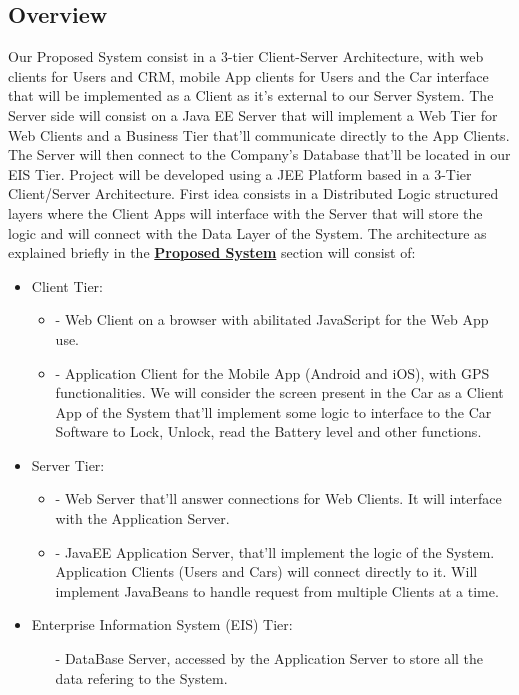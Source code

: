 \documentclass[a4paper]{article}
\begin{document}
\subsection{Overview}
\label{sec:propSystem}
Our Proposed System consist in a 3-tier Client-Server Architecture, with web clients for Users and CRM, mobile App clients for Users and the Car interface that will be implemented as a Client as it's external to our Server System. The Server side will consist on a Java EE Server that will implement a Web Tier for Web Clients and a Business Tier that'll communicate directly to the App Clients. The Server will then connect to the Company's Database that'll be located in our EIS Tier.
Project will be developed using a JEE Platform based in a 3-Tier Client/Server Architecture. First idea consists in a Distributed Logic structured layers where the Client Apps will interface with the Server that will store the logic and will connect with the Data Layer of the System. The architecture as explained briefly in the \textbf{\hyperref[sec:propSystem]{Proposed System}} section will consist of:
\begin {itemize}
\item Client Tier: 
\begin {itemize}
\item [-]Web Client on a browser with abilitated JavaScript for the Web App use. 
\item [-]Application Client for the Mobile App (Android and iOS), with GPS functionalities. We will consider the screen present in the Car as a Client App of the System that'll implement some logic to interface to the Car Software to Lock, Unlock, read the Battery level and other functions.
\end{itemize}

\item Server Tier:
\begin {itemize}
\item [-]Web Server that'll answer connections for Web Clients. It will interface with the Application Server.
\item [-]JavaEE Application Server, that'll implement the logic of the System. Application Clients (Users and Cars) will connect directly to it. Will implement JavaBeans to handle request from multiple Clients at a time.
\end{itemize}

\item Enterprise Information System (EIS) Tier:
\begin{itemize}
\item [-]DataBase Server, accessed by the Application Server to store all the data refering to the System.
\end{itemize}
\end{itemize}
\end{document}
